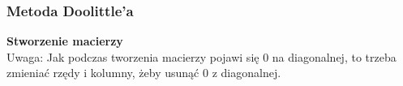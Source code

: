 \documentclass{article}
\begin{document}


\subsubsection{Metoda Doolittle'a}
\textbf{Stworzenie macierzy}\\
Uwaga: Jak podczas tworzenia macierzy pojawi się 0 na diagonalnej, to trzeba zmieniać rzędy i kolumny, żeby usunąć 0 z diagonalnej. \\
\end{document}
